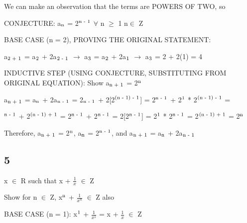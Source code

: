 \documentclass{article}
\begin{document}
\noindent We can make an observation that the terms are POWERS OF TWO, so \vspace{0.5cm}

\noindent CONJECTURE: a$\textsubscript{n}$ = 2$\textsuperscript{n - 1}$ $\forall$ n $\geq$ 1 n$\in$ Z \vspace{0.5cm}

\noindent BASE CASE (n = 2), PROVING THE ORIGINAL STATEMENT: \vspace{0.5cm}

\noindent a$\textsubscript{2 + 1}$ = a$\textsubscript{2}$ + 2a$\textsubscript{2 - 1}$ $\rightarrow$ a$\textsubscript{3}$ = a$\textsubscript{2}$ + 2a$\textsubscript{1}$ $\rightarrow$ a$\textsubscript{3}$ = 2 + 2(1) = 4 \vspace{0.5cm}

\noindent INDUCTIVE STEP (USING CONJECTURE, SUBSTITUTING FROM ORIGINAL EQUATION): Show a$\textsubscript{n + 1}$ = 2$\textsuperscript{n}$ \vspace{0.5cm}

\noindent a$\textsubscript{n + 1}$ = a$\textsubscript{n}$ + 2a$\textsubscript{n - 1}$ = 2$\textsubscript{n - 1}$ + 2[2$\textsuperscript{(n - 1) - 1}$] = 2$\textsuperscript{n - 1}$ + 2$\textsuperscript{1}$ * 2$\textsuperscript{(n - 1) - 1}$ = \par

$\textsuperscript{n - 1}$ + 2$\textsuperscript{(n - 1) + 1}$ = 2$\textsuperscript{n - 1}$ + 2$\textsuperscript{n - 1}$ = 2[2$\textsuperscript{n - 1}$] = 2$\textsuperscript{1}$ * 2$\textsuperscript{n - 1}$ = 2$\textsuperscript{(n - 1) + 1}$ = 2$\textsuperscript{n}$ \vspace{0.5cm}

\noindent Therefore, a$\textsubscript{n + 1}$ = 2$\textsuperscript{n}$, a$\textsubscript{n}$ = 2$\textsuperscript{n - 1}$, and a$\textsubscript{n + 1}$ = a$\textsubscript{n}$ + 2a$\textsubscript{n - 1}$ \vspace{0.5cm}

\subsection{5}

x $\in$ R such that x + $\frac{1}{x}$ $\in$ Z \par
\noindent Show for n $\in$ Z, x$\textsuperscript{n}$ + $\frac{1}{x^n}$ $\in$ Z also \vspace{0.5cm}

\noindent BASE CASE (n = 1): x$\textsuperscript{1}$ + $\frac{1}{x^1}$ = x + $\frac{1}{x}$ $\in$ Z \vspace{0.5cm}
\end{document}
